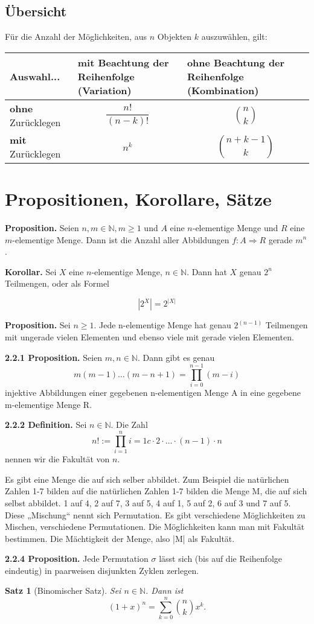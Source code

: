 \documentclass[12pt, twoside]{article}
\newcommand{\N}{\mathbb{N}}
\newtheorem{Sa}{Satz}[section]
\begin{document}
\subsection{Übersicht}
Für die Anzahl der Möglichkeiten, aus $n$ Objekten $k$ auszuwählen, gilt: \\


\begin{centering}
\begin{tabular}{l|p{4.5cm}|p{4.5cm}}
Auswahl... & \textbf{mit} Beachtung der Reihenfolge (Variation) & \textbf{ohne} Beachtung der Reihenfolge (Kombination) \\
\hline
\textbf{ohne} Zurücklegen &  $$\frac{n!}{(n-k)!}$$  & $$\binom{n}{k}$$  \\
\hline
\textbf{mit} Zurücklegen & $$n^k$$ & $$\binom{n+k-1}{k}$$ \\

\end{tabular}
\end{centering}


\section{Propositionen, Korollare, Sätze}
\textbf{Proposition.} Seien $n, m \in \N, m \ge 1$ und $A$ eine $n$-elementige Menge und $R$ eine $m$-elementige Menge. Dann ist die Anzahl aller Abbildungen $f:A \Rightarrow R$ gerade $m^n$.

\textbf{Korollar.} Sei $X$ eine $n$-elementige Menge, $n \in \N$. Dann hat $X$ genau $2^n$ Teilmengen, oder als Formel

$$|2^X|=2^{|X|}$$





\textbf{Proposition.} Sei  $n \ge 1$. Jede n-elementige Menge hat genau $2^{(n-1)}$ Teilmengen mit ungerade vielen Elementen und ebenso viele mit gerade vielen Elementen. 

\textbf{2.2.1 Proposition.} Seien $m, n \in \N $. Dann gibt es genau 
$$
m(m-1)\dots (m-n+1)= \prod_{i=0}^{n-1} (m-i)
$$
injektive Abbildungen einer gegebenen n-elementigen Menge A in eine gegebene m-elementige Menge R.

\textbf{2.2.2 Definition.} Sei $n \in \N$. Die Zahl
$$
n!:= \prod_{i=1}^{n}i=1c\cdot 2 \cdot \ldots \cdot(n-1)\cdot n
$$
nennen wir die Fakultät von $n$.


Es gibt eine Menge die auf sich selber abbildet. Zum Beispiel die natürlichen Zahlen 1-7 bilden auf die natürlichen Zahlen 1-7 bilden die Menge M, die auf sich selbst abbildet. 1 auf 4, 2  auf 7, 3 auf 5, 4 auf 1, 5 auf 2, 6 auf 3 und 7 auf 5. Diese „Mischung“ nennt sich Permutation.  Es gibt verschiedene Möglichkeiten zu Mischen, verschiedene Permutationen. Die Möglichkeiten kann man mit Fakultät bestimmen. Die Mächtigkeit der Menge, also |M| als Fakultät.

\textbf{2.2.4 Proposition.} Jede Permutation $\sigma$ lässt sich (bis auf die Reihenfolge eindeutig) in paarweisen disjunkten Zyklen zerlegen.
\begin{Sa}[Binomischer Satz]
Sei $n \in \N$. Dann ist
$$
(1+x)^n= \sum_{k=0}^{n} \binom{n}{k}x^k.
$$
\end{Sa}
\end{document}
